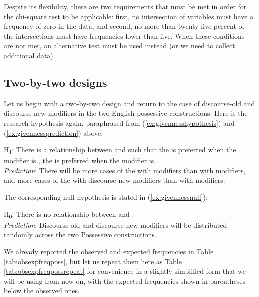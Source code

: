 Despite its flexibility, there are two requirements that must be met in order for the chi-square test to be applicable: first, no intersection of variables must have a frequency of zero in the data, and second, no more than twenty-five percent of the intersections must have frequencies lower than five. When these conditions are not met, an alternative test must be used instead (or we need to collect additional data).

\subsection{Two-by-two designs}
\label{sec:chisquaretwobytwo}

Let us begin with a two-by-two design and return to the case of discourse-old and discourse-new modifiers in the two English possessive constructions. Here is the research hypothesis again, paraphrased from (\ref{ex:givennesshypothesis}) and (\ref{ex:givennessprediction}) above:

\begin{exe}
\ex H\textsubscript{1}: There is a relationship between  and  such that the  is preferred when the modifier is , the  is preferred when the modifier is .\\
\textit{Prediction}: There will be more cases of the  with  modifiers than with  modifiers, and more cases of the  with discourse-new modifiers than with  modifiers.
\label{ex:givennessalternative}
\end{exe}

The corresponding null hypothesis is stated in (\ref{ex:givennessnull}):

\begin{exe}
\ex H\textsubscript{0}: There is no relationship between  and .\\
\textit{Prediction}: Discourse-old and discourse-new modifiers will be distributed randomly across the two Possessive constructions.
\label{ex:givennessnull}
\end{exe}

We already reported the observed and expected frequencies in Table \ref{tab:obsexpfreqposs}, but let us repeat them here as Table \ref{tab:obsexpfreqpossrepeat} for convenience in a slightly simplified form that we will be using from now on, with the expected frequencies shown in parentheses below the observed ones.

